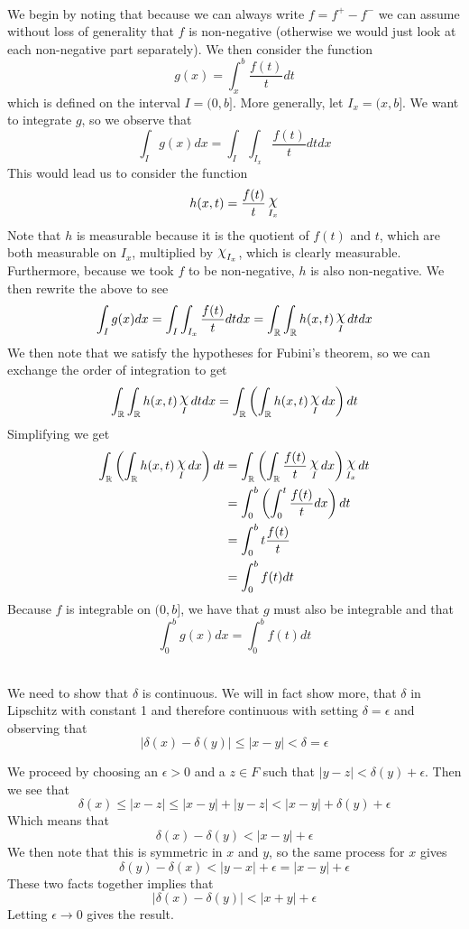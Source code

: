 \documentclass{article}
\DeclareMathOperator{\R}{\mathbb{R}}
\DeclareMathOperator{\capchi}{\raisebox{2pt}{$\mathlarger{\mathlarger{\chi}}$}}
\newcommand{\problem}[1]{\noindent{\textbf{Problem #1}}\\}
\newcommand{\problempart}[1]{\noindent{\textbf{(#1)}}}
\begin{document}
\problem{2.5.4}
\indent We begin by noting that because we can always write $f = f^+ - f^-$ we can assume without loss of generality that $f$ is non-negative (otherwise we would just look at each non-negative part separately). We then consider the function 
\[
g(x) = \int_x^b \frac{f(t)}{t}dt
\]
which is defined on the interval $I = (0, b]$. More generally, let $I_x = (x,b]$. We want to integrate $g$, so we observe that
\[
\int_I g(x)dx = \int_I\int_{I_x} \frac{f(t)}{t}dtdx
\]
This would lead us to consider the function
\[
h(x,t) = \frac{f(t)}{t}\capchi_{I_x}
\]
Note that $h$ is measurable because it is the quotient of $f(t)$ and $t$, which are both measurable on $I_x$, multiplied by $\capchi_{I_x}$, which is clearly measurable. Furthermore, because we took $f$ to be non-negative, $h$ is also non-negative. We then rewrite the above to see
\[
\int_I g(x)dx = \int_I\int_{I_x} \frac{f(t)}{t}dtdx = \int_{\R}\int_{\R} h(x,t)\capchi_{I}dtdx
\]
We then note that we satisfy the hypotheses for Fubini's theorem, so we can exchange the order of integration to get
\[
\int_{\R}\int_{\R} h(x,t)\capchi_{I}dtdx = \int_{\R}\left(\int_{\R} h(x,t)\capchi_{I}dx\right)dt
\]
Simplifying we get
\begin{align*}
\int_{\R}\left(\int_{\R} h(x,t)\capchi_{I}dx\right)dt &= \int_{\R}\left(\int_{\R} \frac{f(t)}{t}\capchi_{I}dx\right)\capchi_{I_x}dt \\
&= \int_{0}^b\left(\int_{0}^t \frac{f(t)}{t}dx\right)dt \\
&= \int_0^b t\frac{f(t)}{t}\\
&= \int_0^b f(t)dt
\end{align*}
Because $f$ is integrable on $(0,b]$, we have that $g$ must also be integrable and that
\[
\int_0^b g(x)dx = \int_0^b f(t)dt
\]

\problem{2.5.5}
\problempart{a} We need to show that $\delta$ is continuous. We will in fact show more, that $\delta$ in Lipschitz with constant 1 and therefore continuous with setting $\delta = \epsilon$ and observing that
\[
|\delta(x) - \delta(y)| \leq |x-y| < \delta = \epsilon
\]

We proceed by choosing an $\epsilon > 0$ and a $z \in F$ such that $|y - z| < \delta(y) + \epsilon$. Then we see that
\[
\delta(x) \leq |x - z| \leq |x-y| + |y-z| < |x - y| + \delta(y) + \epsilon
\] 
Which means that
\[
\delta(x) - \delta(y) < |x - y| + \epsilon
\]
We then note that this is symmetric in $x$ and $y$, so the same process for $x$ gives
\[
\delta(y) - \delta(x) < |y - x| + \epsilon = |x - y| + \epsilon 
\]
These two facts together implies that
\[
|\delta(x) - \delta(y)| < |x + y| + \epsilon
\]
Letting $\epsilon \to 0$ gives the result. 
\end{document}
